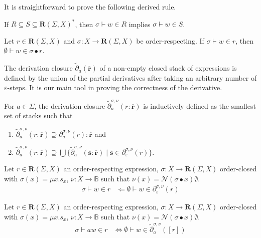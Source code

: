 \documentclass[runningheads, envcountsame, a4paper]{llncs}
\newcommand\bool{\mathbb{B}}
\newcommand\pderiv[3][{}]{\partial^{#1}_{#3}(#2)}
\newcommand\cderiv[3][{}]{\tilde\partial^{#1}_{#3}(#2)}
\newcommand\Reg{\mathbf{R}}
\newcommand\PUSH{:}
\newcommand\SINGLETON[1]{{[#1]}}
\newcommand\Null{\mathcal{N}}
\newcommand\RS{\ensuremath{\overline{\mathbf{r}}}}
\renewcommand\SS{\ensuremath{\overline{\mathbf{s}}}}
\newcommand\ApplySubst[2]{#1 \bullet #2} %
\begin{document}
It is straightforward to prove the following derived rule.
\begin{lemma}\label{lemma:membership-subset}
  If $R \subseteq S \subseteq \Reg (\Sigma, X)^*$,
  then $\sigma \vdash w \in R$ implies $\sigma \vdash w \in S$.
\end{lemma}


\begin{lemma}\label{lemma:membership-apply-substitution}
  Let $r\in \Reg (\Sigma, X)$ and $\sigma : X \to \Reg (\Sigma, X)$ be order-respecting.
  If $\sigma \vdash w \in r$, then $\emptyset \vdash w \in \ApplySubst\sigma r$.
\end{lemma}
The derivation closure $\cderiv\RS a$ of a non-empty closed stack of expressions is defined by
the union of the partial derivatives after taking an arbitrary number
of $\varepsilon$-steps. It is our main tool in proving the correctness
of the derivative.
\begin{definition}
  For $a\in \Sigma$, the derivation closure $\cderiv[\sigma,\nu]{r \PUSH \RS} a$
  is inductively defined as the smallest set of stacks such that
  \begin{enumerate}
  \item $\cderiv[\sigma,\nu]{r \PUSH \RS} a \supseteq \pderiv[\sigma,\nu]{r}{a} \PUSH \RS$ and
  \item $\cderiv[\sigma,\nu]{r \PUSH \RS} a \supseteq \bigcup \{ \cderiv[\sigma,\nu]{\SS \PUSH
    \RS}{a} \mid \SS \in \pderiv[\sigma,\nu]{r}{\varepsilon} \}$.
  \end{enumerate}
\end{definition}
\begin{lemma}[Unfolding]\label{lemma:derivation-unfolding}
  Let $r \in \Reg (\Sigma, X)$ an order-respecting expression,
  $\sigma : X \to \Reg (\Sigma, X)$ order-closed with $\sigma (x) =
  \mu x.s_x$,
  $\nu : X \to \bool$ such that $\nu(x) =
  \Null (\ApplySubst \sigma x)\emptyset$.
  \begin{align*}
    \sigma \vdash w \in r & \Leftarrow
    \emptyset \vdash w \in \pderiv[\sigma,\nu]{ r}{\varepsilon}
  \end{align*}
\end{lemma}
\begin{theorem}[Correctness]\label{lemma:derivation-correct}
  Let $r \in \Reg (\Sigma, X)$ an order-respecting expression,
  $\sigma : X \to \Reg (\Sigma, X)$ order-closed with $\sigma (x) =
  \mu x.s_x$,
  $\nu : X \to \bool$ such that $\nu(x) =
  \Null (\ApplySubst \sigma x)\emptyset$.
  \begin{align*}
    \sigma \vdash aw \in r & \Leftrightarrow
    \emptyset \vdash w \in \cderiv[\sigma,\nu]{\SINGLETON r}{a}
  \end{align*}
\end{theorem}
\end{document}
